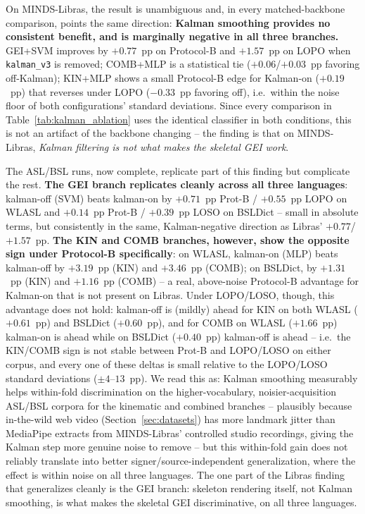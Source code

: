 \documentclass[journal]{IEEEtran}
\begin{document}
On MINDS-Libras, the result is unambiguous and, in every matched-backbone comparison, points the same direction: \textbf{Kalman smoothing provides no consistent benefit, and is marginally negative in all three branches.} GEI+SVM improves by $+0.77$~pp on Protocol-B and $+1.57$~pp on LOPO when \texttt{kalman\_v3} is removed; COMB+MLP is a statistical tie ($+0.06$/$+0.03$~pp favoring off-Kalman); KIN+MLP shows a small Protocol-B edge for Kalman-on ($+0.19$~pp) that reverses under LOPO ($-0.33$~pp favoring off), i.e.\ within the noise floor of both configurations' standard deviations. Since every comparison in Table~\ref{tab:kalman_ablation} uses the identical classifier in both conditions, this is not an artifact of the backbone changing -- the finding is that on MINDS-Libras, \emph{Kalman filtering is not what makes the skeletal GEI work}.

The ASL/BSL runs, now complete, replicate part of this finding but complicate the rest. \textbf{The GEI branch replicates cleanly across all three languages}: kalman-off (SVM) beats kalman-on by $+0.71$~pp Prot-B / $+0.55$~pp LOPO on WLASL and $+0.14$~pp Prot-B / $+0.39$~pp LOSO on BSLDict -- small in absolute terms, but consistently in the same, Kalman-negative direction as Libras' $+0.77$/$+1.57$~pp. \textbf{The KIN and COMB branches, however, show the opposite sign under Protocol-B specifically}: on WLASL, kalman-on (MLP) beats kalman-off by $+3.19$~pp (KIN) and $+3.46$~pp (COMB); on BSLDict, by $+1.31$~pp (KIN) and $+1.16$~pp (COMB) -- a real, above-noise Protocol-B advantage for Kalman-on that is not present on Libras. Under LOPO/LOSO, though, this advantage does not hold: kalman-off is (mildly) ahead for KIN on both WLASL ($+0.61$~pp) and BSLDict ($+0.60$~pp), and for COMB on WLASL ($+1.66$~pp) kalman-on is ahead while on BSLDict ($+0.40$~pp) kalman-off is ahead -- i.e.\ the KIN/COMB sign is not stable between Prot-B and LOPO/LOSO on either corpus, and every one of these deltas is small relative to the LOPO/LOSO standard deviations ($\pm4$--$13$~pp). We read this as: Kalman smoothing measurably helps within-fold discrimination on the higher-vocabulary, noisier-acquisition ASL/BSL corpora for the kinematic and combined branches -- plausibly because in-the-wild web video (Section~\ref{sec:datasets}) has more landmark jitter than MediaPipe extracts from MINDS-Libras' controlled studio recordings, giving the Kalman step more genuine noise to remove -- but this within-fold gain does not reliably translate into better signer/source-independent generalization, where the effect is within noise on all three languages. The one part of the Libras finding that generalizes cleanly is the GEI branch: skeleton rendering itself, not Kalman smoothing, is what makes the skeletal GEI discriminative, on all three languages.
\end{document}
